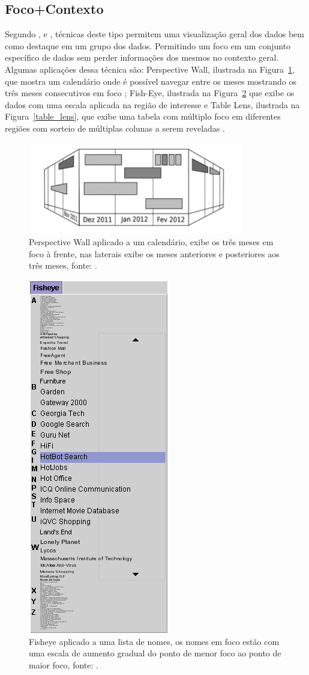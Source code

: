 \documentclass[article,11pt,oneside,a4paper]{abntex2} %
\begin{document}
	\subsection{Foco+Contexto}
		\hspace{13pt}
	Segundo ,  e , técnicas deste tipo permitem uma visualização geral dos dados bem como destaque em um grupo dos dados. Permitindo um foco em um conjunto específico de dados sem perder informações dos mesmos no contexto geral. Algumas aplicações dessa técnica são: Perspective Wall, ilustrada na Figura~\ref{pers_wall}, que mostra um calendário onde é possível navegar entre os meses mostrando os três meses consecutivos em foco \cite{mackinlay1991perspective}; Fish-Eye, ilustrada na Figura~\ref{fish_eye} que exibe os dados com uma escala aplicada na região de interesse \cite{bederson2000fisheye} e Table Lens, ilustrada na Figura~\ref{table_lens}, que exibe uma tabela com múltiplo foco em diferentes regiões com sorteio de múltiplas colunas a serem reveladas \cite{rao1994table} .
	
	
	\begin{figure}[!h]
	{\centering
			\includegraphics[width=\linewidth/2]{figuras/pers_wall.png}
			\caption{Perspective Wall aplicado a um calendário, exibe os três meses em foco à frente, nas laterais exibe os meses anteriores e posteriores aos três meses, fonte: \cite{mackinlay1991perspective}.}
			\label{pers_wall}
	}
	\end{figure}	


	\begin{figure}[!h]
	{\centering
		\includegraphics[height=0.5\linewidth]{figuras/fish_eye.png}
		\caption{Fisheye aplicado a uma lista de nomes, os nomes em foco estão com uma escala de aumento gradual do ponto de menor foco ao ponto de maior foco, fonte: \cite{bederson2000fisheye}.}
		\label{fish_eye}
	}
	\end{figure}
\end{document}
